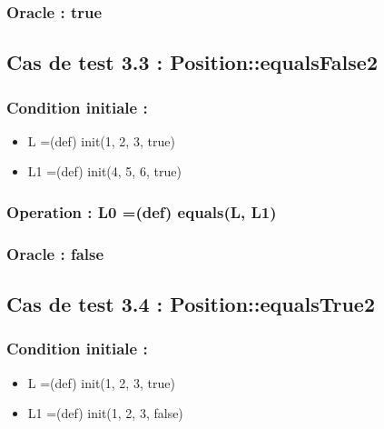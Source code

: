 \documentclass[11pt]{article}
\begin{document}
\subsubsection{Oracle : true}
\label{sec-1.9.3}


\subsection{Cas de test 3.3 : Position::equalsFalse2}
\label{sec-1.10}

\subsubsection{Condition initiale :}
\label{sec-1.10.1}

\begin{itemize}

\item L =(def) init(1, 2, 3, true)\\
\label{sec-1.10.1.1}


\item L1 =(def) init(4, 5, 6, true)\\
\label{sec-1.10.1.2}

\end{itemize} %
\subsubsection{Operation : L0 =(def) equals(L, L1)}
\label{sec-1.10.2}

\subsubsection{Oracle : false}
\label{sec-1.10.3}


\subsection{Cas de test 3.4 : Position::equalsTrue2}
\label{sec-1.11}

\subsubsection{Condition initiale :}
\label{sec-1.11.1}

\begin{itemize}

\item L =(def) init(1, 2, 3, true)\\
\label{sec-1.11.1.1}


\item L1 =(def) init(1, 2, 3, false)\\
\label{sec-1.11.1.2}

\end{itemize} %
\end{document}
